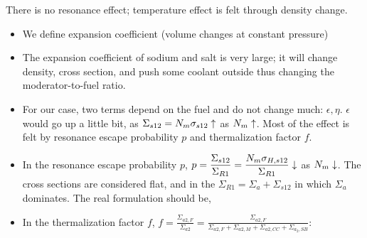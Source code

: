 \documentclass{school-22.211-notes}
\begin{document}
\begin{enumerate}

      There is no resonance effect; temperature effect is felt through
      density change.
      \begin{itemize}
      \item We define expansion coefficient (volume changes at
        constant pressure) 


      \item The expansion coefficient of sodium and salt is very
        large; it will change density, cross section, and push some
        coolant outside thus changing the moderator-to-fuel ratio.

      \item For our case, two terms depend on the fuel and do not
        change much: $\epsilon, \eta$. $\epsilon$ would go up a little
        bit, as $\Sigma_{s12} = N_m \sigma_{s12} \uparrow$ as $N_m
        \uparrow$. Most of the effect is felt by resonance escape
        probability $p$ and thermalization factor $f$.

      \item In the resonance escape probability $p$, $\displaystyle p
        = \frac{\Sigma_{s12}}{\Sigma_{R1}} = \frac{N_m \sigma_{H,
            s12}}{\Sigma_{R1}} \downarrow$ as $N_m \downarrow$. The cross
        sections are considered flat, and in the $\Sigma_{R1} =
        \Sigma_a + \Sigma_{s12}$ in which $\Sigma_a$ dominates. The
        real formulation should be,



      \item In the thermalization factor $f$, $\displaystyle f =
        \frac{\Sigma_{a2,F}}{\Sigma_{a2}} = \frac{\Sigma_{a2,
            F}}{\Sigma_{a2,F} + \Sigma_{a2, M} + \Sigma_{a2, CC} +
          \Sigma_{a_2, SB}} $:


\end{itemize}
\end{enumerate}
\end{document}
